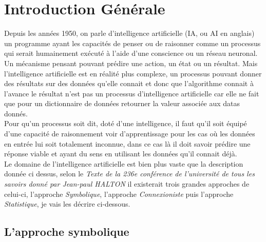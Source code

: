 \chapter{Introduction Générale}
\pagebreak

Depuis les années 1950, on parle d'intelligence artificielle (IA, ou AI en anglais) un programme ayant les capacités de penser ou de raisonner comme un processus qui serait humainement exécuté à l'aide d'une conscience ou un réseau neuronal. Un mécanisme pensant pouvant prédire une action, un état ou un résultat. Mais l'intelligence artificielle est en réalité plus complexe, un processus pouvant donner des résultats sur des données qu'elle connait et donc que l'algorithme connait à l'avance le résultat n'est pas un processus d'intelligence artificielle car elle ne fait que pour un dictionnaire de données retourner la valeur associée aux datas donnés. \\
Pour qu'un processus soit dit, doté d'une intelligence, il faut qu'il soit équipé d'une capacité de raisonnement voir d'apprentissage pour les cas où les données en entrée lui soit totalement inconnue, dans ce cas là il doit savoir prédire une réponse viable et ayant du sens en utilisant les données qu'il connait déjà.\\
\linebreak
Le domaine de l'intelligence artificielle est bien plus vaste que la description donnée ci dessus, selon le \textit{Texte de la 236e conférence de l'université de tous les savoirs donné par Jean-paul HALTON} il existerait trois grandes approches de celui-ci, l'approche \emph{Symbolique}, l'approche \emph{Connexioniste} puis l'approche \emph{Statistique}, je vais les décrire ci-dessous.

\pagebreak
\section{L'approche symbolique}

